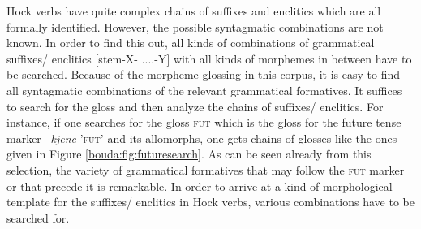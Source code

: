 Hoc{\A}k verbs have quite complex chains of suffixes and enclitics which are all formally identified. However, the possible syntagmatic combinations are not known. In order to find this out, all kinds of combinations of grammatical suffixes/ enclitics [stem-X- ....-Y] with all kinds of morphemes in between have to be searched. Because of the morpheme glossing in this corpus, it is easy to find all syntagmatic combinations of the relevant grammatical formatives. It suffices to search for the gloss and then analyze the chains of suffixes/ enclitics. For instance, if one searches for the gloss \textsc{fut} which is the gloss for the future tense marker --\textit{kjene} '\textsc{fut}' and its allomorphs, one gets chains of glosses like the ones given in Figure  \ref{bouda:fig:futuresearch}. As can be seen already from this selection, the variety of grammatical formatives that may follow the \textsc{fut} marker or that precede it is remarkable. In order to arrive at a kind of morphological template for the suffixes/ enclitics in Hoc{\A}k verbs, various combinations have to be searched for.

